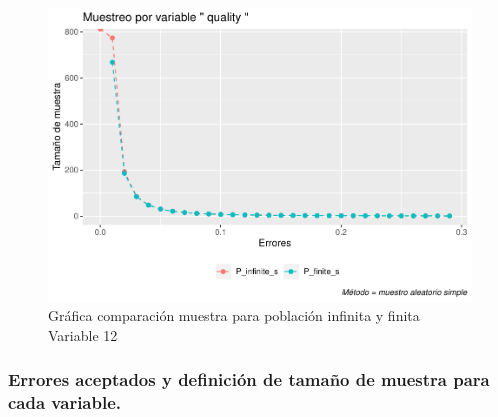 \documentclass[
]{article}
\begin{document}
\begin{figure}
\centering
\includegraphics{1_examen_solucion_files/figure-latex/grafica va12-1.pdf}
\caption{Gráfica comparación muestra para población infinita y finita
Variable 12}
\end{figure}

\hypertarget{errores-aceptados-y-definiciuxf3n-de-tamauxf1o-de-muestra-para-cada-variable.}{%
\subsubsection{Errores aceptados y definición de tamaño de muestra para
cada
variable.}\label{errores-aceptados-y-definiciuxf3n-de-tamauxf1o-de-muestra-para-cada-variable.}}
\end{document}

